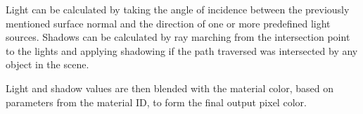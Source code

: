 				Light can be calculated by taking the angle of incidence between
				the previously mentioned surface normal and the direction of one 
				or more predefined light sources. Shadows can be calculated by 
				ray marching from the intersection point to the lights and 
				applying shadowing if the path traversed was intersected by any
				object in the scene. 
				
				Light and shadow values are then blended with the material color,
				based on parameters from the material ID, to form the final 
				output pixel color.
						
